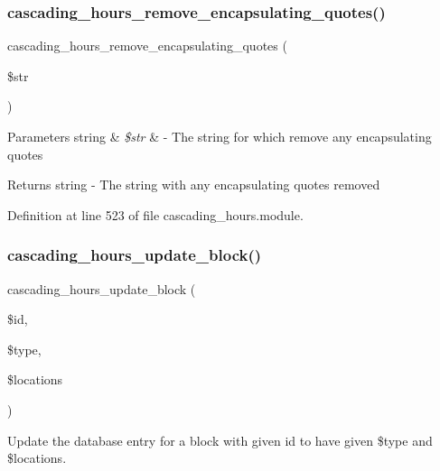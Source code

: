 \subsubsection{\texorpdfstring{cascading\+\_\+hours\+\_\+remove\+\_\+encapsulating\+\_\+quotes()}{cascading\_hours\_remove\_encapsulating\_quotes()}}
{\footnotesize\ttfamily cascading\+\_\+hours\+\_\+remove\+\_\+encapsulating\+\_\+quotes (\begin{DoxyParamCaption}\item[{}]{\$str }\end{DoxyParamCaption})}


\begin{DoxyParams}[1]{Parameters}
string & {\em \$str} & -\/ The string for which remove any encapsulating quotes \\
\hline
\end{DoxyParams}
\begin{DoxyReturn}{Returns}
string -\/ The string with any encapsulating quotes removed 
\end{DoxyReturn}


Definition at line 523 of file cascading\+\_\+hours.\+module.

\mbox{\label{cascading__hours_8module_a0f6b7d82ca5c3f3c748e01d781a72783_a0f6b7d82ca5c3f3c748e01d781a72783}} 
\subsubsection{\texorpdfstring{cascading\+\_\+hours\+\_\+update\+\_\+block()}{cascading\_hours\_update\_block()}}
{\footnotesize\ttfamily cascading\+\_\+hours\+\_\+update\+\_\+block (\begin{DoxyParamCaption}\item[{}]{\$id,  }\item[{}]{\$type,  }\item[{}]{\$locations }\end{DoxyParamCaption})}



Update the database entry for a block with given id to have given \$type and \$locations. 



